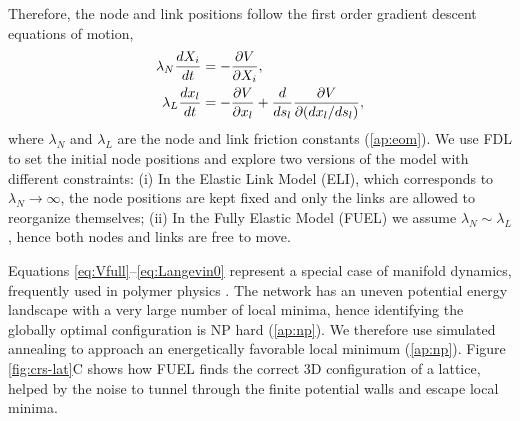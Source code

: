\documentclass[endfloats,nofootinbib,preprint,floatfix,titlepage,superscriptaddress]{revtex4} %
\begin{document}
Therefore, the node and link positions follow the first order gradient descent equations of motion, 
\begin{align}
    \lambda_N {dX_i\over dt} &= -{\ro V \over \ro X_i} %
    \label{eq:nodes},\\
    \lambda_L {dx_l \over dt} & =  -{\ro V \over \ro x_l} + {d\over ds_l} {\ro V \over \ro (dx_l /ds_l)}   \label{eq:Langevin0},
\end{align}
where $\lambda_N$ and $\lambda_L$ are the node and link friction constants (\ref{ap:eom}). 
We use FDL to set the initial node positions and explore two versions of the model with different constraints: 
(i) In the Elastic Link Model (ELI), which corresponds to $\lambda_N\to \infty$, the node positions are kept fixed and only the links are allowed to reorganize themselves; 
(ii) In the Fully Elastic Model (FUEL) we assume $\lambda_N \sim \lambda_L$, hence both nodes and links are free to move. 

Equations \eqref{eq:Vfull}--\eqref{eq:Langevin0} represent a special case of manifold dynamics, frequently used in polymer physics \cite{mezard1991replica}. 
The network has an uneven potential energy landscape \cite{bouchaud1998out} %
with a very large number of local minima, hence identifying the globally optimal configuration is NP hard (\ref{ap:np}).
We therefore use simulated annealing \cite{kirkpatrick1987optimization} %
to approach an energetically favorable local minimum (\ref{ap:np}). 
Figure \ref{fig:crs-lat}C shows how FUEL finds the correct 3D configuration of a lattice, %
helped by the noise to tunnel through the finite potential walls and escape local minima. 
\end{document}
